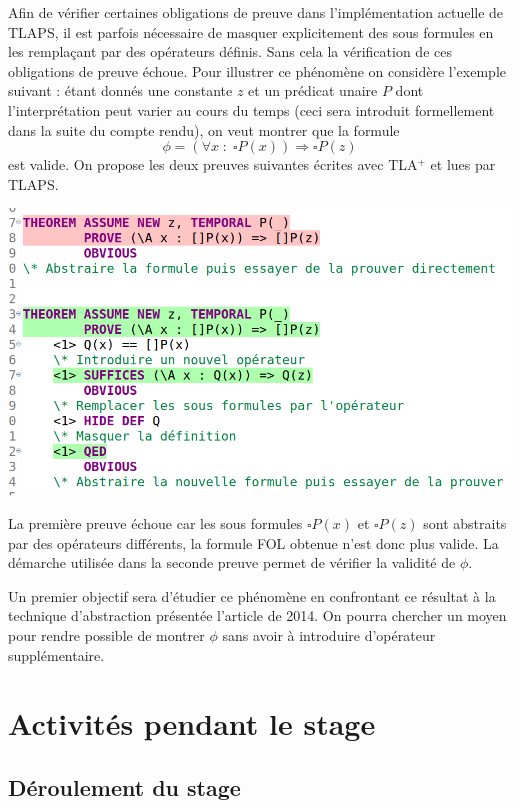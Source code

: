 \documentclass[12pt]{article}
\begin{document}
Afin de vérifier certaines obligations de preuve dans l'implémentation actuelle de TLAPS, il est parfois nécessaire de masquer explicitement des sous formules en les remplaçant par des opérateurs définis.
Sans cela la vérification de ces obligations de preuve échoue.
Pour illustrer ce phénomène on considère l'exemple suivant :
étant donnés une constante $z$ et un prédicat unaire $P$ dont l'interprétation peut varier au cours du temps (ceci sera introduit formellement dans la suite du compte rendu), on veut montrer que la formule
\[ \phi = (\forall x \; : \; \square P(x)) \Rightarrow \square P(z) \]
est valide.
On propose les deux preuves suivantes écrites avec TLA$^+$ et lues par TLAPS.
\begin{center}
  \includegraphics[width=0.8\linewidth]{tlaps_operateur}
\end{center}

La première preuve échoue car les sous formules $\square P(x)$ et $\square P(z)$ sont abstraits par des opérateurs différents, la formule FOL obtenue n'est donc plus valide.
La démarche utilisée dans la seconde preuve permet de vérifier la validité de $\phi$.

Un premier objectif sera d'étudier ce phénomène en confrontant ce résultat à la technique d'abstraction présentée l'article de 2014. On pourra chercher un moyen pour rendre possible de montrer $\phi$ sans avoir à introduire d'opérateur supplémentaire.


\section{Activités pendant le stage}

\subsection{Déroulement du stage}
\end{document}
